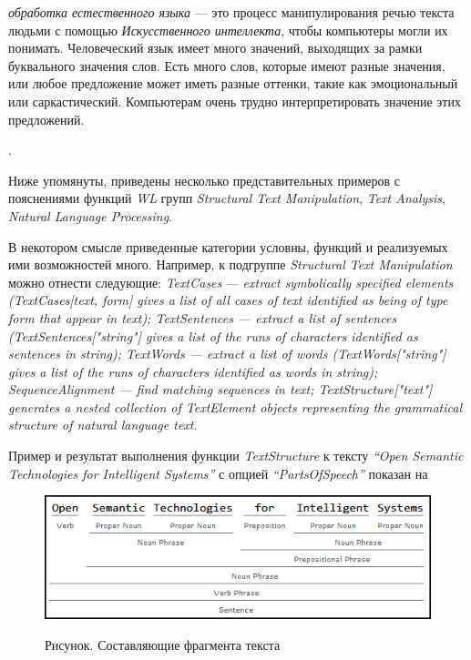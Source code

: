 \textit{обработка естественного языка} --- это процесс манипулирования речью текста людьми с помощью \textit{Искусственного интеллекта}, чтобы компьютеры могли их понимать. 
Человеческий язык имеет много значений, выходящих за рамки буквального значения слов. Есть много слов, которые имеют разные значения, или любое предложение может иметь разные оттенки, такие как эмоциональный или саркастический. Компьютерам очень трудно интерпретировать значение этих предложений. 

.

Ниже упомянуты, приведены несколько представительных примеров с пояснениями функций \textit{WL} групп \textit{Structural Text Manipulation}, \textit{Text Analysis}, \textit{Natural Language Processing}. 

В некотором смысле приведенные категории условны, функций и реализуемых ими возможностей много. Например, к подгруппе \textit{Structural Text Manipulation} можно отнести следующие: 
\textit{TextCases} --- \textit{extract symbolically specified elements (TextCases[text, form] gives a list of all cases of text identified as being of type form that appear in text); TextSentences --- extract a list of sentences (TextSentences["string"] gives a list of the runs of characters identified as sentences in string); TextWords --- extract a list of words (TextWords["string"] gives a list of the runs of characters identified as words in string); SequenceAlignment --- find matching sequences in text; TextStructure["text"] generates a nested collection of TextElement objects representing the grammatical structure of natural language text}.

Пример и результат выполнения функции \textit{TextStructure} к тексту \textit{``Open Semantic Technologies for Intelligent Systems''} с опцией \textit{``PartsOfSpeech''} показан на \textit{}
\begin{figure}[H]
	\caption{Рисунок. Составляющие фрагмента текста}
	\includegraphics[scale=0.8]{images/part7/chapter_integration/integr_alg4.png}
	\label{fig:integr_alg4}
\end{figure}

